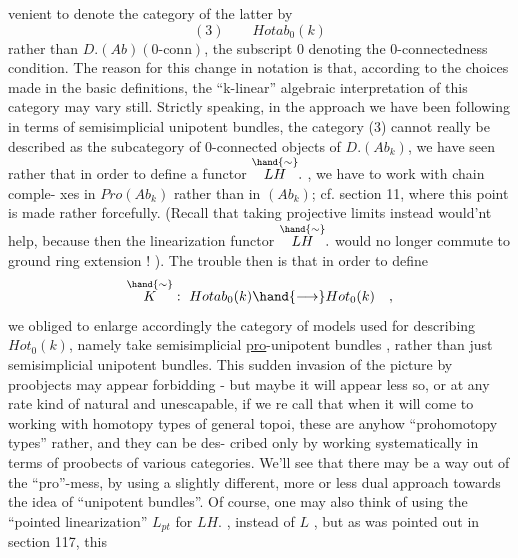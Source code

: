 venient to denote the category of the latter by
\[ (3) \qquad Hotab_0(k) \]
rather than $D.(Ab)(0\text{-conn})$,  the subscript 0 denoting the 0-connectedness
condition.  The reason for this change in notation is that,  according
to the choices made in the basic definitions,  the ``k-linear'' algebraic
interpretation of this category may vary still.  Strictly speaking,  in
the approach we have been following in terms of semisimplicial unipotent
bundles,  the category (3) cannot really be described as the subcategory
of 0-connected objects of $D.(Ab_k)$,  we have seen rather that in order to
define a functor $\overset{\hand{\sim}}{LH}.$ ,  we have to work with  chain comple-%
xes in $Pro(Ab_k)$  rather than  in $(Ab_k)$; \xout{(}cf. section 11, where this
point is made rather forcefully. (Recall that taking projective limits
instead would'nt help,  because then the linearization functor $\overset{\hand{\sim}}{LH}.$
would no longer commute to ground ring extension ! ).  The trouble then
is that in order to define
\[ \overset{\hand{\sim}}{K} : \ Hotab_0(k) \hand{\longrightarrow} Hot_0(k) \quad , \]
we  obliged to enlarge accordingly the category of models used for
describing  $Hot_0(k)$,  namely take semisimplicial \uline{pro}-unipotent bundles ,
rather than just semisimplicial unipotent bundles.  This sudden invasion
of the picture by proobjects may appear forbidding  -  but maybe it will
appear less so,  or at any rate kind of natural and unescapable,  if we re%
\hand{-}call that when it will come to working with homotopy types of general
topoi,  these are anyhow ``prohomotopy types'' rather,  and they can be des-%
cribed only  by working systematically in terms of proobects of
various categories.  We'll see  that there may be a way out of the
``pro''-mess,  by using a slightly different,  more or less dual approach
towards the idea of ``unipotent bundles''.  Of course,  one may also think
of using the ``pointed linearization'' $L_{pt}$ for $LH.$ ,  instead of $L$ ,
 but as was pointed out in section 117,  this
